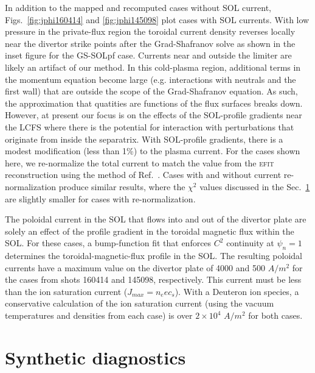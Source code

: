 \documentclass[english,aps,superscriptaddress,showkeys,showpacs,prepri,twocolumn]{revtex4}
\begin{document}
In addition to the mapped and recomputed cases without SOL current,
Figs.~\ref{fig:jphi160414} and \ref{fig:jphi145098} plot cases with SOL
currents. With low pressure in the private-flux region the toroidal current
density reverses locally near the divertor strike points after the
Grad-Shafranov solve as shown in the inset figure for the GS-SOLpf case.
Currents near and outside the limiter are likely an artifact of our method.  In
this cold-plasma region, additional terms in the momentum equation become large
(e.g.  interactions with neutrals and the first wall) that are outside the
scope of the Grad-Shafranov equation. As such, the approximation that quatities
are functions of the flux surfaces breaks down. However, at present our focus is
on the effects of the SOL-profile gradients near the LCFS where there is the
potential for interaction with perturbations that originate from inside the
separatrix. With SOL-profile gradients, there is a modest modification (less
than 1\%) to the plasma current. For the cases shown here, we re-normalize the
total current to match the value from the \textsc{efit} reconstruction using
the method of Ref.~\cite{lutjens96}.  Cases with and without current
re-normalization produce similar results, where the $\chi^2$ values discussed
in the Sec.~\ref{sec:diagnostics} are slightly smaller for cases with
re-normalization.

The poloidal current in the SOL that flows into and out of the divertor plate
are solely an effect of the profile gradient in the toroidal magnetic flux
within the SOL. For these cases, a bump-function fit that enforces $C^2$
continuity at $\psi_n=1$ determines the toroidal-magnetic-flux profile in the
SOL. The resulting poloidal currents have a maximum value on the divertor plate
of 4000 and 500 $A/m^2$ for the cases from shots 160414 and 145098,
respectively. This current must be less than the ion saturation current
($J_{max}=n_e e c_s$). With a Deuteron ion species, a conservative calculation of
the ion saturation current (using the vacuum temperatures and densities from
each case) is over $2\times10^4$ $A/m^2$ for both cases.

\section{Synthetic diagnostics}
\label{sec:diagnostics}
\end{document}
